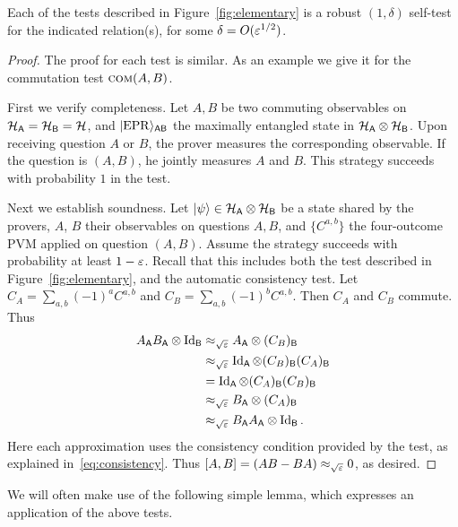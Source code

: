 \begin{lemma}\label{lem:elementary}
Each of the tests described in Figure~\ref{fig:elementary} is a robust $(1,\delta)$ self-test for the indicated relation(s), for some $\delta = O(\varepsilon^{1/2})$. 
\end{lemma}

\begin{proof}
The proof for each test is similar. As an example we give it for the commutation test $\textsc{com}(A,B)$. 

First we verify completeness. Let $A,B$ be two commuting observables on $\mathcal{H}_{{\textsf{A}}} = \mathcal{H}_{{\textsf{B}}} = \mathcal{H}$, and $|{\rm EPR}\rangle_{{\textsf{AB}}}$ the maximally entangled state in $\mathcal{H}_{\textsf{A}}\otimes \mathcal{H}_{\textsf{B}}$. Upon receiving question $A$ or $B$, the prover measures the corresponding observable. If the question is $(A,B)$, he jointly measures $A$ and $B$. This strategy succeeds with probability $1$ in the test. 

Next we establish soundness. Let $|\psi\rangle \in \mathcal{H}_{{\textsf{A}}}\otimes \mathcal{H}_{\textsf{B}}$ be a state shared by the provers, $A$, $B$ their observables on questions $A,B$, and $\{C^{a,b}\}$ the four-outcome PVM applied on question $(A,B)$. Assume the strategy succeeds with probability at least $1-\varepsilon$. Recall that this includes both the test described in Figure~\ref{fig:elementary}, and the automatic consistency test. Let $C_A = \sum_{a,b} (-1)^a C^{a,b}$ and $C_B = \sum_{a,b} (-1)^b C^{a,b}$. Then $C_A$ and $C_B$ commute. Thus
\begin{align*}
A_{\textsf{A}} B_{\textsf{A}} \otimes \mathop{\rm Id}\nolimits_{\textsf{B}}
&\approx_{\sqrt{\varepsilon}} A_{\textsf{A}} \otimes (C_B)_{\textsf{B}}\\
&\approx_{\sqrt{\varepsilon}} \mathop{\rm Id}\nolimits_{\textsf{A}} \otimes (C_B)_{\textsf{B}}(C_A)_{\textsf{B}}\\
&=  \mathop{\rm Id}\nolimits_{\textsf{A}} \otimes (C_A)_{\textsf{B}}(C_B)_{\textsf{B}}\\
&\approx_{\sqrt{\varepsilon}} B_{\textsf{A}} \otimes (C_A)_{\textsf{B}}\\
&\approx_{\sqrt{\varepsilon}} B_{\textsf{A}} A_{\textsf{A}} \otimes \mathop{\rm Id}\nolimits_{\textsf{B}}.
\end{align*}
Here each approximation uses the consistency condition provided by the test, as explained in~\eqref{eq:consistency}. Thus $[A,B] = (AB-BA) \approx_{\sqrt{\varepsilon}} 0$, as desired. 
\end{proof}

We will often make use of the following simple lemma, which expresses an application of the above tests. 

